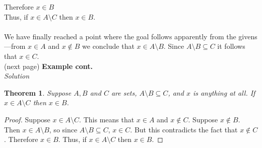 \documentclass{report}
\newtheorem*{theorem}{Theorem}
\theoremstyle{definition}
\begin{document}
\indent\indent Therefore $x\in B$\\
\indent Thus, if $x\in A\setminus C$ then $x\in B$.\\
\vspace{1mm}\\
We have finally reached a point where the goal follows apparently from the givens---from $x\in A$ and $x\notin B$ we conclude that $x\in A\setminus B$. Since $A\setminus B\subseteq C$ it
follows that $x\in C$.\\
(next page)\newpage
\noindent\textbf{Example cont.}\\
\textit{Solution}
\begin{theorem}
Suppose $A,B$ and $C$ are sets, $A\setminus B\subseteq C$, and $x$ is anything at all. If $x\in A\setminus C$ then $x\in B$.
\end{theorem}
\begin{proof}
Suppose $x\in A\setminus C$. This means that $x\in A$ and $x\notin C$. Suppose $x\notin B$. Then
$x\in A\setminus B$, so since $A\setminus B\subseteq C$, $x\in C$. But this contradicts the fact that $x\notin C$. Therefore $x\in B$. Thus, if $x\in A\setminus C$ then $x\in B$.
\end{proof}
\end{document}
